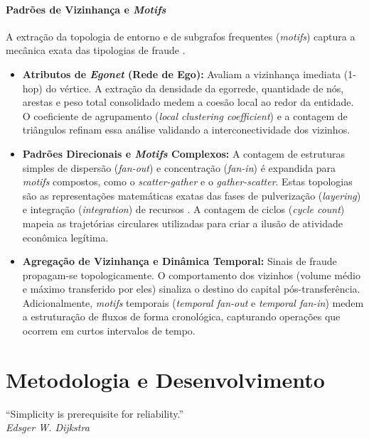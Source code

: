 \documentclass[a4paper,12pt,oneside,onecolumn,final,fleqn]{repUERJ}
\begin{document}
\subsubsection{Padrões de Vizinhança e \textit{Motifs}}
A extração da topologia de entorno e de subgrafos frequentes (\textit{motifs}) captura a mecânica exata das tipologias de fraude \cite{akoglu2010oddball, mitchell2019effectiveness}.
\begin{itemize}

\item \textbf{Atributos de \textit{Egonet} (Rede de Ego):} Avaliam a vizinhança imediata (1-hop) do vértice. A extração da densidade da egorrede, quantidade de nós, arestas e peso total consolidado medem a coesão local ao redor da entidade. O coeficiente de agrupamento (\textit{local clustering coefficient}) e a contagem de triângulos refinam essa análise validando a interconectividade dos vizinhos.

\item \textbf{Padrões Direcionais e \textit{Motifs} Complexos:} A contagem de estruturas simples de dispersão (\textit{fan-out}) e concentração (\textit{fan-in}) é expandida para \textit{motifs} compostos, como o \textit{scatter-gather} e o \textit{gather-scatter}. Estas topologias são as representações matemáticas exatas das fases de pulverização (\textit{layering}) e integração (\textit{integration}) de recursos \cite{weber2019anti}. A contagem de ciclos (\textit{cycle count}) mapeia as trajetórias circulares utilizadas para criar a ilusão de atividade econômica legítima.

\item \textbf{Agregação de Vizinhança e Dinâmica Temporal:} Sinais de fraude propagam-se topologicamente. O comportamento dos vizinhos (volume médio e máximo transferido por eles) sinaliza o destino do capital pós-transferência. Adicionalmente, \textit{motifs} temporais (\textit{temporal fan-out} e \textit{temporal fan-in}) medem a estruturação de fluxos de forma cronológica, capturando operações que ocorrem em curtos intervalos de tempo.

\end{itemize}

\chapter{Metodologia e Desenvolvimento}
\label{cap:metodologia}

\begin{epigrafeonline}
\hfill ``Simplicity is prerequisite for reliability.''\hspace{0.2cm}\null\\
\hspace*{\fill}\textit{Edsger W. Dijkstra}\\
\end{epigrafeonline}
\end{document}
